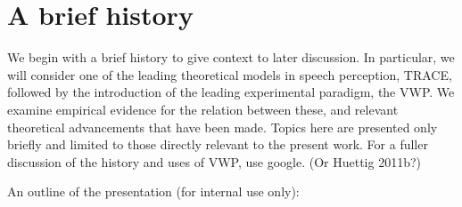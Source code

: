 \documentclass{article}
\begin{document}



\section{A brief history}
We begin with a brief history to give context to later discussion. In particular, we will consider one of the leading theoretical models in speech perception, TRACE, followed by the introduction of the leading experimental paradigm, the VWP. We examine empirical evidence for the relation between these, and relevant theoretical advancements that have been made. Topics here are presented only briefly and limited to those directly relevant to the present work. For a fuller discussion of the history and uses of VWP, use google. (Or Huettig 2011b?)

An outline of the presentation (for internal use only):
\end{document}

